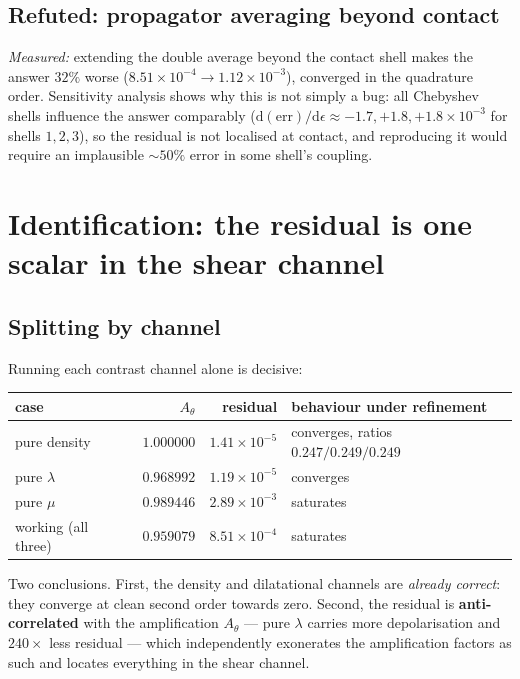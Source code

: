 \documentclass[11pt,a4paper]{article}
\begin{document}
\subsection{Refuted: propagator averaging beyond contact}

\emph{Measured:} extending the double average beyond the contact shell makes the
answer $32\%$ worse ($8.51\times10^{-4}\to1.12\times10^{-3}$), converged in the
quadrature order. Sensitivity analysis shows why this is not simply a bug: all
Chebyshev shells influence the answer comparably ($\mathrm{d}(\text{err})/
\mathrm{d}\epsilon \approx -1.7,+1.8,+1.8\times10^{-3}$ for shells $1,2,3$), so
the residual is not localised at contact, and reproducing it would require an
implausible $\sim\!50\%$ error in some shell's coupling.

\section{Identification: the residual is one scalar in the shear channel}

\subsection{Splitting by channel}

Running each contrast channel alone is decisive:

\begin{center}
\begin{tabular}{lrrl}
\toprule
case & $A_\theta$ & residual & behaviour under refinement \\
\midrule
pure density & $1.000000$ & $1.41\times10^{-5}$ & converges, ratios $0.247/0.249/0.249$ \\
pure $\lambda$ & $0.968992$ & $1.19\times10^{-5}$ & converges \\
pure $\mu$ & $0.989446$ & $2.89\times10^{-3}$ & saturates \\
working (all three) & $0.959079$ & $8.51\times10^{-4}$ & saturates \\
\bottomrule
\end{tabular}
\end{center}

Two conclusions. First, the density and dilatational channels are \emph{already
correct}: they converge at clean second order towards zero. Second, the residual
is \textbf{anti-correlated} with the amplification $A_\theta$ --- pure $\lambda$
carries more depolarisation and $240\times$ less residual --- which independently
exonerates the amplification factors as such and locates everything in the shear
channel.
\end{document}
